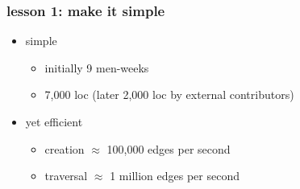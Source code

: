 \documentclass{beamer}
\newcommand{\monvert}[1]{{\color{blue}#1}}
\newcommand{\ocamlgraph}{\textsf{OCamlGraph}}
\newcommand{\present}{{\monvert{\large\boldmath $\surd$}}}
\newcommand{\absent}{\textcolor{red}{\large\boldmath $\oslash$}}
\let\emph\alert
\begin{document}

\begin{frame}\frametitle{lesson 1: make it simple}
  \begin{itemize}
  \item simple
    \begin{itemize}
    \item initially 9 men-weeks
    \item 7,000 loc (later 2,000 loc by external contributors)
    \end{itemize}

    \bigskip
  \item yet efficient
    \begin{itemize}
    \item creation $\approx$ 100,000 edges per second
    \item traversal $\approx$ 1 million edges per second
    \end{itemize}
  \end{itemize}
\end{frame}
\end{document}
